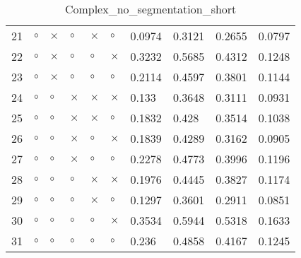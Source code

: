 \begin{table}[H]
\begin{tabular}{|P{0.7cm}|P{1.3cm}P{1.3cm}P{1.3cm}P{1.3cm}P{1.3cm}|P{1.1cm}P{1.1cm}P{1.1cm}P{1.1cm}|}
  21 &  $\circ$ & $\times$ &  $\circ$ & $\times$ &     $\circ$ &          0.0974 &          0.3121 &          0.2655 &          0.0797 \\
  22 &  $\circ$ & $\times$ &  $\circ$ &  $\circ$ &    $\times$ &          0.3232 &          0.5685 &          0.4312 &          0.1248 \\
  23 &  $\circ$ & $\times$ &  $\circ$ &  $\circ$ &     $\circ$ &          0.2114 &          0.4597 &          0.3801 &          0.1144 \\
  24 &  $\circ$ &  $\circ$ & $\times$ & $\times$ &    $\times$ &           0.133 &          0.3648 &          0.3111 &          0.0931 \\
  25 &  $\circ$ &  $\circ$ & $\times$ & $\times$ &     $\circ$ &          0.1832 &           0.428 &          0.3514 &          0.1038 \\
  26 &  $\circ$ &  $\circ$ & $\times$ &  $\circ$ &    $\times$ &          0.1839 &          0.4289 &          0.3162 &          0.0905 \\
  27 &  $\circ$ &  $\circ$ & $\times$ &  $\circ$ &     $\circ$ &          0.2278 &          0.4773 &          0.3996 &          0.1196 \\
  28 &  $\circ$ &  $\circ$ &  $\circ$ & $\times$ &    $\times$ &          0.1976 &          0.4445 &          0.3827 &          0.1174 \\
  29 &  $\circ$ &  $\circ$ &  $\circ$ & $\times$ &     $\circ$ &          0.1297 &          0.3601 &          0.2911 &          0.0851 \\
  30 &  $\circ$ &  $\circ$ &  $\circ$ &  $\circ$ &    $\times$ &          0.3534 &          0.5944 &          0.5318 &          0.1633 \\
  31 &  $\circ$ &  $\circ$ &  $\circ$ &  $\circ$ &     $\circ$ &           0.236 &          0.4858 &          0.4167 &          0.1245 \\
\hline
\end{tabular}
\caption{Complex_no_segmentation_short}
\label{tab:}
\end{table}
